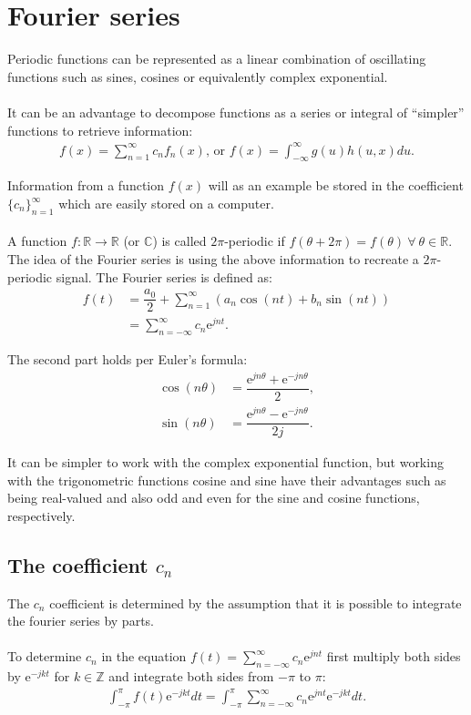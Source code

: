\section{Fourier series}
Periodic functions can be represented as a linear combination of oscillating functions such as sines, cosines or equivalently complex exponential.
\\ \\
It can be an advantage to decompose functions as a series or integral of ``simpler'' functions to retrieve information:
\begin{align*}
f(x) = \sum_{n=1}^\infty c_n f_n(x)\text{, or } f(x)= \int_{-\infty}^\infty g(u) h(u,x) du.
\end{align*}

Information from a function $f(x)$ will as an example be stored in the coefficient $\{c_n\}_{n=1}^\infty$ which are easily stored on a computer.
\\ \\ 
A function $f: \mathbb{R} \to \mathbb{R}$ (or $\mathbb{C}$) is called $2\pi$-periodic if $f(\theta + 2\pi) = f(\theta) \ \forall \ \theta\in\mathbb{R}$. The idea of the Fourier series is using the above information to recreate a $2\pi$-periodic signal. The Fourier series is defined as:
\begin{align*}
f(t) &= \dfrac{a_0}{2} + \sum_{n=1}^\infty(a_n \cos(n t) + b_n \sin(n t))\\
&= \sum_{n=-\infty}^{\infty} c_n \text{e}^{j n t}.
\end{align*}

The second part holds per Euler's formula:
\begin{align*}
\cos(n\theta) &= \dfrac{\text{e}^{j n \theta} + \text{e}^{-j n \theta}}{2}, \\
\sin(n \theta) &= \dfrac{\text{e}^{jn\theta}-\text{e}^{-jn\theta}}{2j}.
\end{align*}

It can be simpler to work with the complex exponential function, but working with the trigonometric functions cosine and sine have their advantages such as being real-valued and also odd and even for the sine and cosine functions, respectively.

\subsection{The coefficient $c_n$}
The $c_n$ coefficient is determined by the assumption that it is possible to integrate the fourier series by parts.
\\ \\
To determine $c_n$ in the equation $f(t)= \sum_{n=-\infty}^{\infty} c_n \text{e}^{j n t}$ first multiply both sides by $\text{e}^{-j k t}$ for $k\in \mathbb{Z}$ and integrate both sides from $-\pi$ to $\pi$:
\begin{align} \label{eq:firststep_fouriercoefficient}
\int_{-\pi}^\pi f(t)\text{e}^{-j k t} dt = \int_{-\pi}^\pi \sum_{n=-\infty}^{\infty} c_n \text{e}^{j n t} \text{e}^{-j k t} dt.
\end{align}

